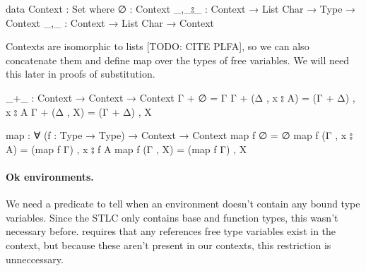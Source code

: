 \documentclass[logo,bsc,singlespacing,parskip,online]{infthesis}
\renewenvironment{code}{\mintedcopy[breaklines,breaksymbolleft=\;]{agda}}{\endmintedcopy}
\begin{document}
\begin{code}
  data Context : Set where
    ∅ : Context
    _,_⦂_ : Context → List Char → Type → Context
    _,_ : Context → List Char → Context
\end{code}

Contexts are isomorphic to lists [TODO: CITE PLFA],
so we can also concatenate them and define map over the types of free variables.
We will need this later in proofs of substitution.

\begin{code}
  _+_ : Context → Context → Context
  Γ + ∅ = Γ
  Γ + (Δ , x ⦂ A) = (Γ + Δ) , x ⦂ A
  Γ + (Δ , X) = (Γ + Δ) , X

  map : ∀ (f : Type → Type) → Context → Context
  map f ∅ = ∅
  map f (Γ , x ⦂ A) = (map f Γ) , x ⦂ f A
  map f (Γ , X) = (map f Γ) , X
\end{code}

\paragraph*{Ok environments.} We need a predicate to tell when an environment doesn't contain any
bound type variables. Since the STLC only contains base and function types, this wasn't necessary
before. \citet{chargueraud_locally_2012} requires that any references free type variables
exist in the context, but because these aren't present in our contexts, this
restriction is unneccessary.
\end{document}
